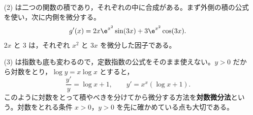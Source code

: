 (2) は二つの関数の積であり，それぞれの中に合成がある。まず外側の積の公式を使い，次に内側を微分する。
\[
 g'(x)=2x\e^{x^2}\sin(3x)+3\e^{x^2}\cos(3x).
\]
$2x$ と $3$ は，それぞれ $x^2$ と $3x$ を微分した因子である。

(3) は指数も底も変わるので，定数指数の公式をそのまま使えない。$y>0$ だから対数をとり，$\log y=x\log x$ とすると，
\[
 \frac{y'}y=\log x+1,
 \qquad y'=x^x(\log x+1).
\]
このように対数をとって積やべきを分けてから微分する方法を\textbf{対数微分法}という。対数をとれる条件 $x>0$，$y>0$ を先に確かめている点も大切である。

